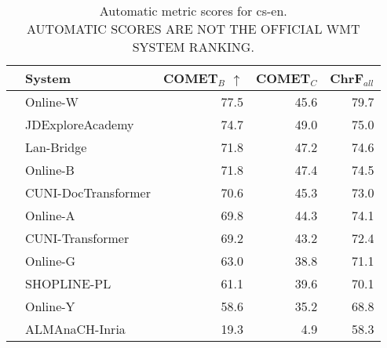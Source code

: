 \begin{table}
\centering
\caption{Automatic metric scores for cs-en. \\AUTOMATIC SCORES ARE NOT THE OFFICIAL WMT SYSTEM RANKING.}
\begin{tabular}{llrrr}
\toprule
          &               System &  COMET$_{B}$ $\uparrow$ &  COMET$_{C}$ &  ChrF$_{all}$ \\
\midrule
 \Uncon{} &             Online-W &                    77.5 &         45.6 &          79.7 \\
 \Const{} &     JDExploreAcademy &                    74.7 &         49.0 &          75.0 \\
 \Uncon{} &           Lan-Bridge &                    71.8 &         47.2 &          74.6 \\
 \Uncon{} &             Online-B &                    71.8 &         47.4 &          74.5 \\
 \Const{} &  CUNI-DocTransformer &                    70.6 &         45.3 &          73.0 \\
 \Uncon{} &             Online-A &                    69.8 &         44.3 &          74.1 \\
 \Const{} &     CUNI-Transformer &                    69.2 &         43.2 &          72.4 \\
 \Uncon{} &             Online-G &                    63.0 &         38.8 &          71.1 \\
 \Const{} &          SHOPLINE-PL &                    61.1 &         39.6 &          70.1 \\
 \Uncon{} &             Online-Y &                    58.6 &         35.2 &          68.8 \\
 \Const{} &       ALMAnaCH-Inria &                    19.3 &          4.9 &          58.3 \\
\bottomrule
\end{tabular}
\end{table}



